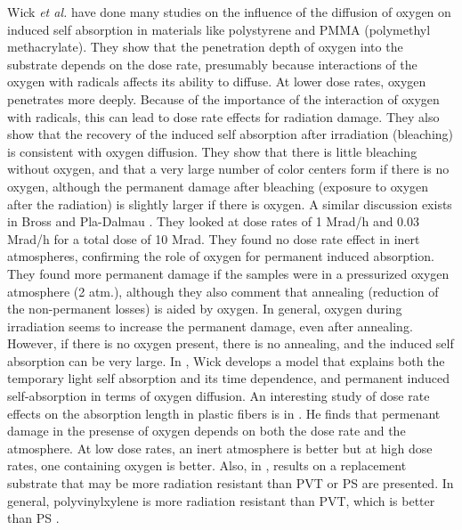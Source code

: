 Wick {\it{et al.}} \cite{Wick1991472}
have done many studies on the influence of the diffusion of oxygen on
induced self absorption
in materials like polystyrene and PMMA
(polymethyl methacrylate).  
They show that the penetration depth of oxygen into the substrate
depends on the dose rate, presumably because interactions
of the oxygen with radicals affects its ability to diffuse.  
At lower dose rates, oxygen penetrates
more deeply.  Because of the importance of the interaction
of oxygen with radicals, this can lead to dose rate effects
for radiation damage.  They also show that the recovery of the
induced self absorption after irradiation (bleaching)
is consistent with
oxygen diffusion.  They show that there is little bleaching
without oxygen, and that a very large number of color centers
form if there is no oxygen, although the permanent damage after
bleaching (exposure to oxygen after the radiation) is slightly
larger if there is oxygen.
A similar discussion exists in Bross and Pla-Dalmau \cite{173178}.
They looked at dose rates of 1 Mrad/h and 0.03 Mrad/h for a
total dose of 10 Mrad.  They found no dose rate effect in
inert atmospheres, confirming the role of oxygen for permanent
induced absorption.  They found more permanent damage if the samples
were in a pressurized oxygen atmosphere (2 atm.), although
they also comment that annealing (reduction of the non-permanent losses)
is aided by oxygen.
In general, oxygen during irradiation seems to increase the permanent
damage, even after annealing.  However, if there is no oxygen present,
there is no annealing, and the induced self absorption can be very large.
In \cite{Wulkop1995141}, Wick develops a model that explains
both the temporary light self absorption
and its time dependence, and permanent induced self-absorption in
terms of oxygen diffusion.
An interesting study of dose rate effects on the absorption length
in plastic fibers is in \cite{zorn2}.  
He finds that permenant damage in the presense of oxygen depends
on both the dose rate and the atmosphere.  At low dose rates,
an inert atmosphere is better but at high dose rates, one containing 
oxygen is better.
Also, in \cite{zorn3}, results on a replacement substrate
that may be more radiation resistant than PVT or PS are presented.
In general, polyvinylxylene is more radiation resistant than PVT, which
is better than PS \cite{sauli}.

